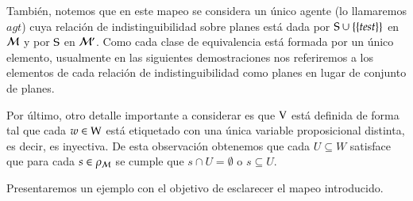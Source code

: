 \begin{definicion}
    También, notemos que en este mapeo se considera un único agente (lo llamaremos $agt$) cuya relación de indistinguibilidad sobre 
    planes está dada por $\S \cup \{\{test\}\}$ en $\model$ y por $\S$ en $\model'$. Como cada clase de equivalencia está formada por un 
    único elemento, usualmente en las siguientes demostraciones nos referiremos a los elementos de cada relación de indistinguibilidad como 
    planes en lugar de conjunto de planes.

    Por último, otro detalle importante a considerar es que $\V$ está definida de forma tal que cada $w\in\W$ está etiquetado con una única 
    variable proposicional distinta, es decir, es inyectiva. De esta observación obtenemos que cada $U \subseteq W$ satisface que para cada 
    $s \in \rho_\modults$ se cumple que $s \cap U = \emptyset$ o $s \subseteq U$.
\end{definicion}

Presentaremos un ejemplo con el objetivo de esclarecer el mapeo introducido.

